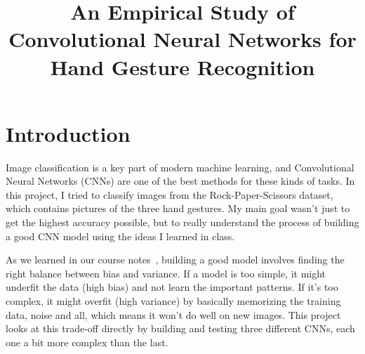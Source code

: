\documentclass[pdflatex,sn-mathphys-num]{sn-jnl}%
\theoremstyle{thmstyleone}%
\theoremstyle{thmstyletwo}%
\theoremstyle{thmstylethree}%
\begin{document}
\title[CNNs for Hand Gesture Recognition]{An Empirical Study of Convolutional Neural Networks for Hand Gesture Recognition}

\author{ }


\maketitle

\section{Introduction}\label{sec1}

Image classification is a key part of modern machine learning, and Convolutional Neural Networks (CNNs) are one of the best methods for these kinds of tasks. In this project, I tried to classify images from the Rock-Paper-Scissors dataset, which contains pictures of the three hand gestures. My main goal wasn't just to get the highest accuracy possible, but to really understand the process of building a good CNN model using the ideas I learned in class.

As we learned in our course notes~\cite{cesa2024smml}, building a good model involves finding the right balance between bias and variance. If a model is too simple, it might underfit the data (high bias) and not learn the important patterns. If it's too complex, it might overfit (high variance) by basically memorizing the training data, noise and all, which means it won't do well on new images. This project looks at this trade-off directly by building and testing three different CNNs, each one a bit more complex than the last.
\end{document}
